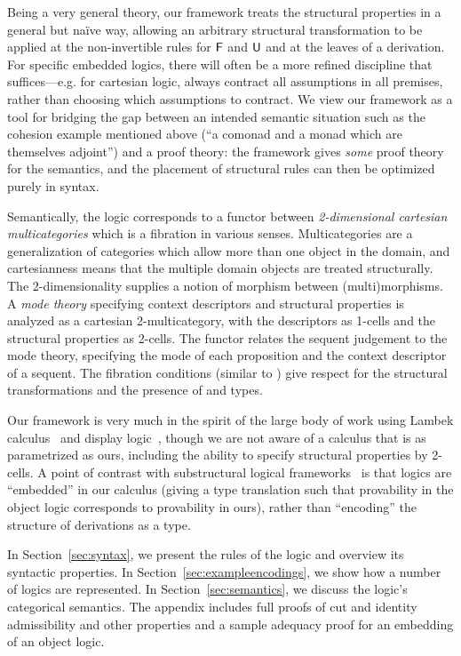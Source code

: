Being a very general theory, our framework treats the structural
properties in a general but na\"ive way, allowing an arbitrary
structural transformation to be applied at the non-invertible rules for
$\mathsf{F}$ and $\mathsf{U}$ and at the leaves of a derivation.  For specific
embedded logics, there will often be a more refined discipline that
suffices---e.g. for cartesian logic, always contract all assumptions
in all premises, rather than choosing which assumptions to contract.  We
view our framework as a tool for bridging the gap between an intended
semantic situation such as the cohesion example mentioned above (``a
comonad and a monad which are themselves adjoint'') and a proof theory:
the framework gives \emph{some} proof theory for the semantics, and the
placement of structural rules can then be optimized purely in syntax.

Semantically, the logic corresponds to a functor between
\emph{2-dimensional cartesian multicategories} which is a fibration in
various senses.  Multicategories are a generalization of categories
which allow more than one object in the domain, and cartesianness means
that the multiple domain objects are treated structurally.  The
2-dimensionality supplies a notion of morphism between (multi)morphisms.
A \emph{mode theory} specifying context descriptors and structural
properties is analyzed as a cartesian 2-multicategory, with the
descriptors as 1-cells and the structural properties as 2-cells.  The
functor relates the sequent judgement to the mode theory, specifying the
mode of each proposition and the context descriptor of a sequent.  The
fibration conditions (similar to
\citep{hermida02fibrations,hormann15multicategories}) give respect for
the structural transformations and the presence of  and 
types.

Our framework is very much in the spirit of the large body of work using
Lambek calculus~\citep{lambek58calculus} and display
logic~\citep{belnap82display}, though we are not aware of a calculus
that is as parametrized as ours, including the ability to specify
structural properties by 2-cells.  A point of contrast with
substructural logical
frameworks~\citep{cervesatopfenning02llf,watkins+03clf-tr,reed09thesis}
is that logics are ``embedded'' in our calculus (giving a type
translation such that provability in the object logic corresponds to
provability in ours), rather than ``encoding'' the structure of
derivations as a type.  

In Section~\ref{sec:syntax}, we present the rules of the logic and
overview its syntactic properties.  In
Section~\ref{sec:exampleencodings}, we show how a number of logics are
represented.  In Section~\ref{sec:semantics}, we discuss the logic's
categorical semantics.  The appendix includes full proofs of cut and
identity admissibility and other properties and a sample adequacy proof
for an embedding of an object logic.

